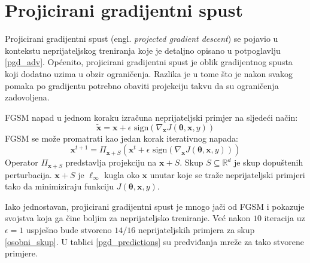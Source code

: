 \documentclass[utf8, diplomski]{fer}
\begin{document}
\section{Projicirani gradijentni spust}\label{pgd_attack} Projicirani gradijentni spust (engl. \textit{projected gradient descent}) se pojavio u kontekstu neprijateljskog treniranja \citep{Madry2017TowardsDL} koje je detaljno opisano u potpoglavlju \ref{pgd_adv}. Općenito, projicirani gradijentni spust je oblik gradijentnog spusta koji dodatno uzima u obzir ograničenja. Razlika je u tome što je nakon svakog pomaka po gradijentu potrebno obaviti projekciju takvu da su ograničenja zadovoljena. \par 
FGSM napad u jednom koraku izračuna neprijateljski primjer na sljedeći način:
\begin{equation}
	\boldsymbol{\tilde{x}} = \boldsymbol{x} + \epsilon \text{ sign}(\nabla_{\boldsymbol{x}} J(\boldsymbol{\theta}, \boldsymbol{x}, y)) 
\end{equation}
FGSM se može promatrati kao jedan korak iterativnog napada:
\begin{equation}
	\boldsymbol{x}^{t+1} = \Pi_{\boldsymbol{x}+S} (\boldsymbol{x}^{t} + \epsilon \text{ sign}(\nabla_{\boldsymbol{x}} J(\boldsymbol{\theta}, \boldsymbol{x}, y)))
\end{equation}
Operator $\Pi_{\boldsymbol{x}+S}$ predstavlja projekciju na $\boldsymbol{x}+S$. Skup $S \subseteq \mathbb{R}^{d}$ je skup dopuštenih perturbacija. $\boldsymbol{x}+S$ je $\ell_{\infty}$ kugla oko $\boldsymbol{x}$ unutar koje se traže neprijateljski primjeri tako da minimiziraju funkciju $J(\boldsymbol{\theta}, \boldsymbol{x}, y)$. \par

Iako jednostavan, projicirani gradijentni spust je mnogo jači od FGSM i pokazuje svojstva koja ga čine boljim za neprijateljsko treniranje. Već nakon $10$ iteracija uz $\epsilon = 1$ uspješno bude stvoreno $14/16$ neprijateljskih primjera za skup \ref{osobni_skup}. U tablici \ref{pgd_predictions} su predviđanja mreže za tako stvorene primjere. 
\end{document}
